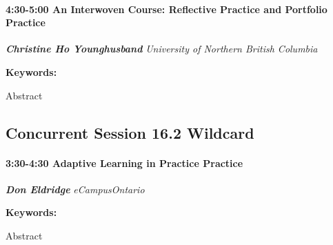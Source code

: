 \documentclass[
]{book}
\begin{document}
\begin{session}
\hypertarget{an-interwoven-course-reflective-practice-and-portfolio-practice}{%
\paragraph*{\texorpdfstring{4:30-5:00 \textbar{} \textbf{An Interwoven
Course: Reflective Practice and Portfolio} \textbar{}
Practice}{4:30-5:00 \textbar{} An Interwoven Course: Reflective Practice and Portfolio \textbar{} Practice}}\label{an-interwoven-course-reflective-practice-and-portfolio-practice}}

\textbf{\emph{Christine Ho Younghusband}} \textbar{} \emph{University of
Northern British Columbia}

\textbf{Keywords:}

Abstract
\end{session}

\hypertarget{concurrent-session-16.2-wildcard}{%
\subsection*{Concurrent Session 16.2 \textbar{} Wildcard}\label{concurrent-session-16.2-wildcard}}

\begin{session}
\hypertarget{adaptive-learning-in-practice-practice}{%
\paragraph*{\texorpdfstring{3:30-4:30 \textbar{} \textbf{Adaptive
Learning in Practice} \textbar{}
Practice}{3:30-4:30 \textbar{} Adaptive Learning in Practice \textbar{} Practice}}\label{adaptive-learning-in-practice-practice}}

\textbf{\emph{Don Eldridge}} \textbar{} \emph{eCampusOntario}

\textbf{Keywords:}

Abstract
\end{session}
\end{document}
